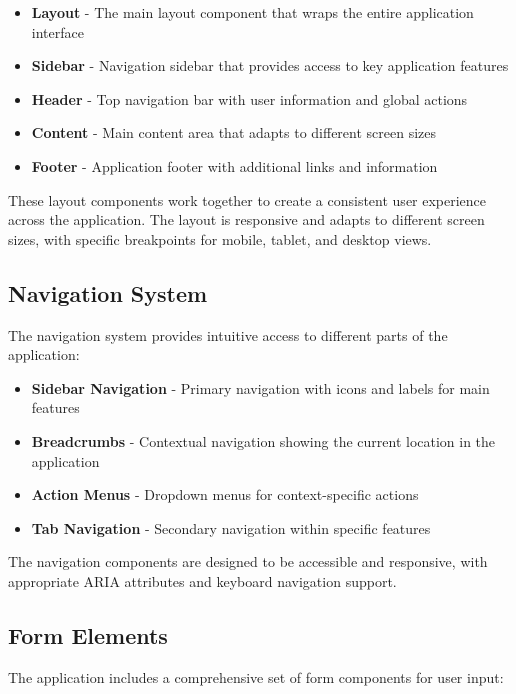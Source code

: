 \begin{itemize}
  \item \textbf{Layout} - The main layout component that wraps the entire application interface
  \item \textbf{Sidebar} - Navigation sidebar that provides access to key application features
  \item \textbf{Header} - Top navigation bar with user information and global actions
  \item \textbf{Content} - Main content area that adapts to different screen sizes
  \item \textbf{Footer} - Application footer with additional links and information
\end{itemize}

These layout components work together to create a consistent user experience across the application. The layout is responsive and adapts to different screen sizes, with specific breakpoints for mobile, tablet, and desktop views.

\subsection{Navigation System}

The navigation system provides intuitive access to different parts of the application:

\begin{itemize}
  \item \textbf{Sidebar Navigation} - Primary navigation with icons and labels for main features
  \item \textbf{Breadcrumbs} - Contextual navigation showing the current location in the application
  \item \textbf{Action Menus} - Dropdown menus for context-specific actions
  \item \textbf{Tab Navigation} - Secondary navigation within specific features
\end{itemize}

The navigation components are designed to be accessible and responsive, with appropriate ARIA attributes and keyboard navigation support.

\subsection{Form Elements}

The application includes a comprehensive set of form components for user input:

